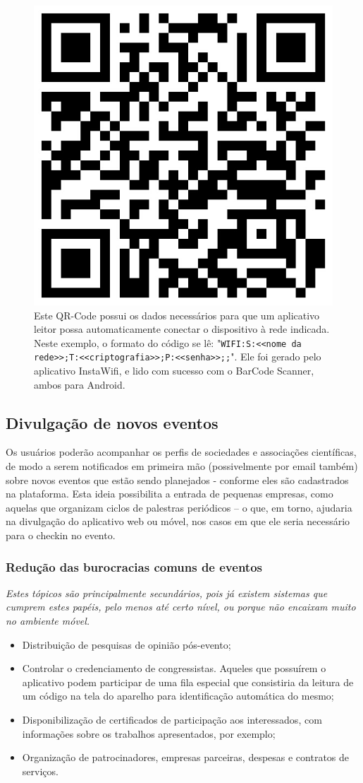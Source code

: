 \documentclass[a4paper]{abntex2}
\begin{document}
\begin{figure}
	\centering
	\includegraphics[width=0.25\linewidth]{imagens/qr-wifi}
	\protect\caption[QR-Code com dados da rede Wi-Fi]{Este QR-Code possui os dados necessários para que um aplicativo leitor possa automaticamente conectar o dispositivo à rede indicada. Neste exemplo, o formato do código se lê: "\texttt{WIFI:S:<<nome da rede>>;T:<<criptografia>>;P:<<senha>>;;}". Ele foi gerado pelo aplicativo InstaWifi\cite{instawifi}, e lido com sucesso com o BarCode Scanner\cite{barcode}, ambos para Android.}
	\label{fig:qr-wifi}
\end{figure}

\subsection*{Divulgação de novos eventos}
Os usuários poderão acompanhar os perfis de sociedades e associações científicas, de modo a serem notificados em primeira mão (possivelmente por email também) sobre novos eventos que estão sendo planejados - conforme eles são cadastrados na plataforma.
Esta ideia possibilita a entrada de pequenas empresas, como aquelas que organizam ciclos de palestras periódicos -- o que, em torno, ajudaria na divulgação do aplicativo web ou móvel, nos casos em que ele seria necessário para o checkin no evento.

\subsubsection*{Redução das burocracias comuns de eventos}
\emph{Estes tópicos são principalmente secundários, pois já existem sistemas que cumprem estes papéis, pelo menos até certo nível, ou porque não encaixam muito no ambiente móvel.}
\begin{itemize}
	\item Distribuição de pesquisas de opinião pós-evento;
	\item Controlar o credenciamento de congressistas. Aqueles que possuírem o aplicativo podem participar de uma fila especial que consistiria da leitura de um código na tela do aparelho para identificação automática do mesmo;
	\item Disponibilização de certificados de participação aos interessados, com informações sobre os trabalhos apresentados, por exemplo;
	\item Organização de patrocinadores, empresas parceiras, despesas e contratos de serviços.
\end{itemize}
\end{document}
